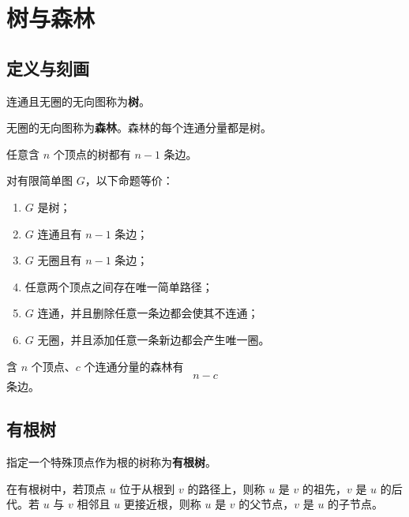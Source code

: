\section{树与森林}

\subsection{定义与刻画}

\begin{definition}[树]
连通且无圈的无向图称为\textbf{树}。
\end{definition}

\begin{definition}[森林]
无圈的无向图称为\textbf{森林}。森林的每个连通分量都是树。
\end{definition}

\begin{theorem}
任意含 $n$ 个顶点的树都有 $n-1$ 条边。
\end{theorem}

\begin{theorem}[树的刻画]
对有限简单图 $G$，以下命题等价：
\begin{enumerate}
    \item $G$ 是树；
    \item $G$ 连通且有 $n-1$ 条边；
    \item $G$ 无圈且有 $n-1$ 条边；
    \item 任意两个顶点之间存在唯一简单路径；
    \item $G$ 连通，并且删除任意一条边都会使其不连通；
    \item $G$ 无圈，并且添加任意一条新边都会产生唯一圈。
\end{enumerate}
\end{theorem}

\begin{theorem}[推论]
含 $n$ 个顶点、$c$ 个连通分量的森林有
\[
    n-c
\]
条边。
\end{theorem}

\subsection{有根树}

\begin{definition}[有根树]
指定一个特殊顶点作为根的树称为\textbf{有根树}。
\end{definition}

\begin{definition}
在有根树中，若顶点 $u$ 位于从根到 $v$ 的路径上，则称 $u$ 是 $v$ 的祖先，$v$ 是 $u$ 的后代。若 $u$ 与 $v$ 相邻且 $u$ 更接近根，则称 $u$ 是 $v$ 的父节点，$v$ 是 $u$ 的子节点。
\end{definition}

